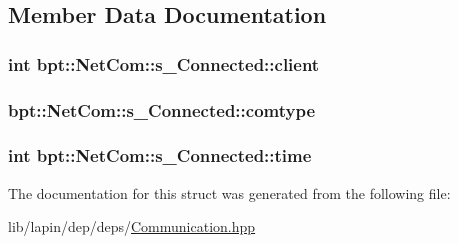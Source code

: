 \subsection{Member Data Documentation}
\hypertarget{structbpt_1_1_net_com_1_1s___connected_a7f4b317b9d3e6018faef1d4a3c7abce7}{
\subsubsection[{client}]{ {\bf int} bpt\-::\-Net\-Com\-::s\-\_\-\-Connected\-::client}}\label{structbpt_1_1_net_com_1_1s___connected_a7f4b317b9d3e6018faef1d4a3c7abce7}
\hypertarget{structbpt_1_1_net_com_1_1s___connected_a8b46edb6918e04e2ace361e9bc9654b0}{
\subsubsection[{comtype}]{ bpt\-::\-Net\-Com\-::s\-\_\-\-Connected\-::comtype}}\label{structbpt_1_1_net_com_1_1s___connected_a8b46edb6918e04e2ace361e9bc9654b0}
\hypertarget{structbpt_1_1_net_com_1_1s___connected_a66ac8237357f9ba3d21a70b7fe3a4586}{
\subsubsection[{time}]{ {\bf int} bpt\-::\-Net\-Com\-::s\-\_\-\-Connected\-::time}}\label{structbpt_1_1_net_com_1_1s___connected_a66ac8237357f9ba3d21a70b7fe3a4586}


The documentation for this struct was generated from the following file\-:\begin{DoxyCompactItemize}
\item 
lib/lapin/dep/deps/\hyperlink{_communication_8hpp}{Communication.\-hpp}\end{DoxyCompactItemize}
